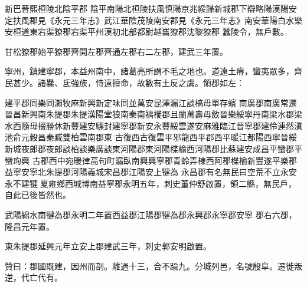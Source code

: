 \begin{pinyinscope}
 新巴晉熙桓陵北陰平郡
 陰平南陽北桓陵扶風慎陽京兆綏歸新城郡下辯略陽漢陽安定扶風郡見《永元三年志》武江華陰茂陵南安郡見《永元三年志》南安華陽白水樂安桓道東宕渠獠郡宕渠平州漢初北部都尉越巂獠郡沈黎獠郡
 蠶陵令，無戶數。



 甘松獠郡始平獠郡齊開左郡齊通左郡右二左郡，建武三年置。



 寧州，鎮建寧郡，本益州南中，諸葛亮所謂不毛之地也。道遠土瘠，蠻夷眾多，齊民甚少。諸爨、氐強族，恃遠擅命，故數有土反之虞。領郡如左：



 建平郡同樂同瀨牧麻新興新定味同並萬安昆澤漏江談槁毋單存蠙
 南廣郡南廣常遷晉昌新興南朱提郡朱提漢陽堂狼南秦南褵褷郡且蘭萬壽毋斂晉樂綏寧丹南梁水郡梁水西隨毋掇勝休新豐建安驃封建寧郡新安永豐綏雲遂安麻雅臨江晉寧郡建伶連然滇池俞元穀昌秦臧雙柏雲南郡東
 古復西古復雲平邪龍西平郡西平暖江都陽西寧晉綏新城夜郎郡夜郎談柏談樂廣談東河陽郡東河陽楪榆西河陽郡比蘇建安成昌平蠻郡平蠻珣興
 古郡西中宛暖律高句町漏臥南興興寧郡青蛉弄棟西阿郡楪榆新豐遂平樂郡益寧安寧北朱提郡河陽義城宋昌郡江陽安上犍為
 永昌郡有名無民曰空荒不立永安永不建犍夏雍鄉西城博南益寧郡永明五年，刺史董仲舒啟置，領二縣，無民戶，自此已後皆然也。



 武陽綿水南犍為郡永明二年置西益郡江陽郡犍為郡永興郡永寧郡安寧
 郡右六郡，隆昌元年置。



 東朱提郡延興元年立安上郡建武三年，刺史郭安明啟置。



 贊曰：郡國既建，因州而剖。離過十三，合不踰九。分城列邑，名號殷阜。遷徙叛逆，代亡代有。



\end{pinyinscope}